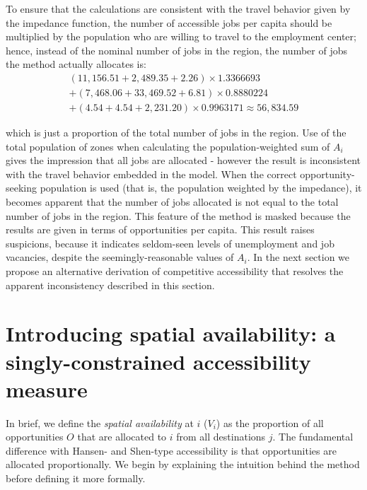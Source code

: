 \documentclass[]{elsarticle} %
\begin{document}
To ensure that the calculations are consistent with the travel behavior
given by the impedance function, the number of accessible jobs per
capita should be multiplied by the population who are willing to travel
to the employment center; hence, instead of the nominal number of jobs
in the region, the number of jobs the method actually allocates is: \[
\begin{array}{l}
(11,156.51 + 2,489.35 + 2.26)\times 1.3366693 \\
+ (7,468.06 + 33,469.52 + 6.81)\times 0.8880224\\
+ (4.54 + 4.54 + 2,231.20)\times 0.9963171 \approx 56,834.59
\end{array}
\]

\noindent which is just a proportion of the total number of jobs in the
region. Use of the total population of zones when calculating the
population-weighted sum of \(A_i\) gives the impression that all jobs
are allocated - however the result is inconsistent with the travel
behavior embedded in the model. When the correct opportunity-seeking
population is used (that is, the population weighted by the impedance),
it becomes apparent that the number of jobs allocated is not equal to
the total number of jobs in the region. This feature of the method is
masked because the results are given in terms of opportunities per
capita. This result raises suspicions, because it indicates seldom-seen
levels of unemployment and job vacancies, despite the
seemingly-reasonable values of \(A_i\). In the next section we propose
an alternative derivation of competitive accessibility that resolves the
apparent inconsistency described in this section.

\hypertarget{introducing-spatial-availability-a-singly-constrained-accessibility-measure}{%
\section{Introducing spatial availability: a singly-constrained
accessibility
measure}\label{introducing-spatial-availability-a-singly-constrained-accessibility-measure}}

In brief, we define the \emph{spatial availability} at \(i\) (\(V_{i}\))
as the proportion of all opportunities \(O\) that are allocated to \(i\)
from all destinations \(j\). The fundamental difference with Hansen- and
Shen-type accessibility is that opportunities are allocated
proportionally. We begin by explaining the intuition behind the method
before defining it more formally.
\end{document}
